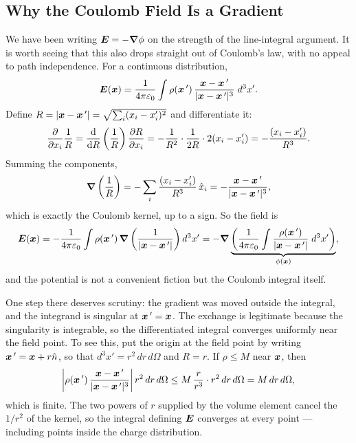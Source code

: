 \subsection{Why the Coulomb Field Is a Gradient}

We have been writing $\vect{E} = -\grad\phi$ on the strength of the line-integral argument. It is worth seeing that this also drops straight out of Coulomb's law, with no appeal to path independence. For a continuous distribution,
\[
    \vect{E}(\lvect{x}) = \frac{1}{4\pi\varepsilon_0}\int \rho(\lvect{x}\,')\,\frac{\lvect{x}-\lvect{x}\,'}{|\lvect{x}-\lvect{x}\,'|^3}\; d^3x'.
\]
Define $R = |\bm{x}-\bm{x}\,'| = \sqrt{\sum_i (x_i - x_i')^2}$ and differentiate it:
\[
    \pdv{x_i}\frac{1}{R} = \dv{R}\left(\frac{1}{R}\right)\pdv{R}{x_i} = -\frac{1}{R^2}\cdot\frac{1}{2R}\cdot 2(x_i - x_i') = -\frac{(x_i - x_i')}{R^3}.
\]
Summing the components,
\[
    \grad\left(\frac{1}{R}\right) = -\sum_i \frac{(x_i - x_i')}{R^3}\,\hat{x}_i = -\frac{\bm{x}-\bm{x}\,'}{|\bm{x}-\bm{x}\,'|^3},
\]
which is exactly the Coulomb kernel, up to a sign. So the field is
\[
    \vect{E}(\lvect{x}) = -\frac{1}{4\pi\varepsilon_0}\int \rho(\lvect{x}\,')\,\grad\left(\frac{1}{|\lvect{x}-\lvect{x}\,'|}\right) d^3x'
    = -\grad\underbrace{\left(\frac{1}{4\pi\varepsilon_0}\int \frac{\rho(\lvect{x}\,')}{|\lvect{x}-\lvect{x}\,'|}\; d^3x'\right)}_{\phi(\lvect{x})},
\]
and the potential is not a convenient fiction but the Coulomb integral itself.

One step there deserves scrutiny: the gradient was moved outside the integral, and the integrand is singular at $\bm{x}\,' = \bm{x}$. The exchange is legitimate because the singularity is integrable, so the differentiated integral converges uniformly near the field point. To see this, put the origin at the field point by writing $\bm{x}\,' = \bm{x} + r\hat{n}$, so that $d^3x' = r^2\,dr\,d\Omega$ and $R = r$. If $\rho \le M$ near $\bm{x}$, then
\[
    \left|\rho(\bm{x}\,')\,\frac{\bm{x}-\bm{x}\,'}{|\bm{x}-\bm{x}\,'|^3}\right| r^2\,dr\,d\Omega \le M\,\frac{r}{r^3}\cdot r^2\,dr\,d\Omega = M\,dr\,d\Omega,
\]
which is finite. The two powers of $r$ supplied by the volume element cancel the $1/r^2$ of the kernel, so the integral defining $\vect{E}$ converges at every point --- including points inside the charge distribution.

